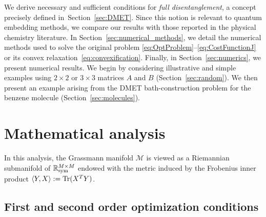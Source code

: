 \documentclass{article}
\newcommand{\tr}{{\rm Tr}}
\newcommand{\1}{{\mathds 1}}
\begin{document}
We derive necessary and sufficient conditions for {\em full disentanglement}, a concept precisely defined in~Section~\ref{sec:DMET}. Since this notion is relevant to quantum embedding methods, we compare our results with those reported in the physical chemistry literature.
In Section~\ref{sec:numerical_methods}, we detail the numerical methods used to solve the original problem \eqref{eq:OptProblem}--\eqref{eq:CostFunctionJ} or its convex relaxation~\eqref{eq:convexification}. Finally, in Section~\ref{sec:numerics}, we present numerical results. We begin by considering illustrative and simple examples using $2 \times 2$ or $3 \times 3$  matrices $A$ and $B$ (Section~\ref{sec:random}). We then present an example arising from the DMET bath-construction problem for the benzene molecule (Section~\ref{sec:molecules}).



\section{Mathematical analysis}
\label{sec:analysis}

In this analysis, the Grassmann manifold $\mathcal M$ is viewed as a Riemannian submanifold of $\mathbb R^{M \times M}_{\rm sym}$ endowed with the metric induced by the Frobenius inner product $\langle Y,X \rangle := \tr(X^TY)$.


\subsection{First and second order optimization conditions}
\label{sec:opt_cond}
\end{document}
